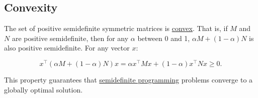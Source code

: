 %
%
%
%

\hypertarget{convexity}{%
\subsection{Convexity}\label{convexity}}

The set of positive semidefinite symmetric matrices is
\href{convex_set}{convex}. That is, if \(M\) and \(N\) are positive
semidefinite, then for any \(\alpha\) between 0 and 1,
\(\alpha M + (1 - \alpha) N\) is also positive semidefinite. For any
vector \(x\):

\[x^\top  \left(\alpha M + (1 - \alpha)N\right)x = \alpha x^\top  Mx + (1 - \alpha) x^\top  Nx \geq 0.\]

This property guarantees that
\href{semidefinite_programming}{semidefinite programming} problems
converge to a globally optimal solution.

%
%

